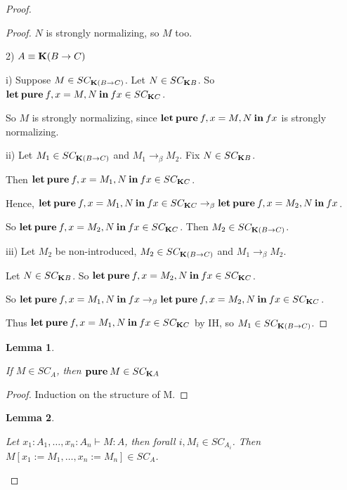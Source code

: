 \documentclass[a4paper]{article}
\newtheorem{lemma}{Lemma}
\begin{document}
\begin{proof}
\begin{proof}
  $N$ is strongly normalizing, so $M$ too.

    \vspace{\baselineskip}

  2) $A \equiv {\bf K}(B \to C)$

  i) Suppose $M \in SC_{{\bf K}(B \to C)}$. Let $N \in SC_{{\bf K}B}$. So ${\bf let \: pure \:} f, x = M, N {\: \bf in \: } f x \in SC_{{\bf K}C}$.

  So $M$ is strongly normalizing, since ${\bf let \: pure \:} f, x = M, N {\: \bf in \: } f x$ is strongly normalizing.

  ii) Let $M_1 \in SC_{{\bf K}(B \to C)}$ and $M_1 \rightarrow_{\beta} M_2$. Fix $N \in SC_{{\bf K}B}$.

  Then ${\bf let \: pure \:} f, x = M_1, N {\: \bf in \: } f x \in SC_{{\bf K}C}$.

  Hence, ${\bf let \: pure \:} f, x = M_1, N {\: \bf in \: } f x \in SC_{{\bf K}C} \rightarrow_{\beta} {\bf let \: pure \:} f, x = M_2, N {\: \bf in \: } f x$.

  So ${\bf let \: pure \:} f, x = M_2, N {\: \bf in \: } f x \in SC_{{\bf K}C}$. Then $M_2 \in SC_{{\bf K}(B \to C)}$.

  iii) Let $M_2$ be non-introduced, $M_2 \in SC_{{\bf K}(B \to C)}$ and $M_1 \rightarrow_{\beta} M_2$.

  Let $N \in SC_{{\bf K}B}$. So ${\bf let \: pure \:} f, x = M_2, N {\: \bf in \:} f x \in SC_{{\bf K}C}$.

  So ${\bf let \: pure \:} f, x = M_1, N {\: \bf in \:} f x \rightarrow_{\beta} {\bf let \: pure \:} f, x = M_2, N {\: \bf in \:} f x \in SC_{{\bf K}C}$.

  Thus ${\bf let \: pure \:} f, x = M_1, N {\: \bf in \:} f x \in SC_{{\bf K}C}$ by IH, so $M_1 \in SC_{{\bf K}(B \to C)}$.
\end{proof}

\begin{lemma}
  $ $

  If $M \in SC_A$, then ${\bf pure \:} M \in SC_{{\bf K}A}$
\end{lemma}

\begin{proof}

  Induction on the structure of M.
\end{proof}

\begin{lemma}
  $ $

  Let $x_1 : A_1,\dots, x_n : A_n \vdash M : A$, then forall $i, M_i \in SC_{A_i}$. Then $M [x_1 := M_1,\dots,x_n := M_n] \in SC_A$.
\end{lemma}


\end{proof}
\end{document}
